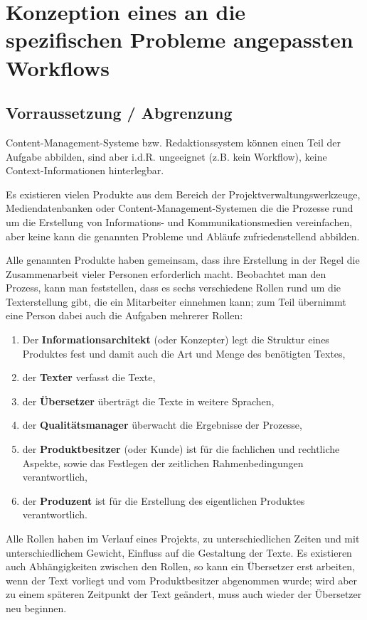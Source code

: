 \section{Konzeption eines an die spezifischen Probleme angepassten Workflows}

\subsection{Vorraussetzung / Abgrenzung}

Content-Management-Systeme bzw. Redaktionssystem können einen Teil der Aufgabe abbilden, sind aber i.d.R. ungeeignet (z.B. kein Workflow), keine Context-Informationen hinterlegbar.



Es existieren vielen Produkte aus dem Bereich der Projektverwaltungswerkzeuge, Mediendatenbanken oder Content-Management-Systemen die die Prozesse rund um die Erstellung von Informations- und Kommunikationsmedien vereinfachen, aber keine kann die genannten Probleme und Abläufe zufriedenstellend abbilden.


Alle genannten Produkte haben gemeinsam, dass ihre Erstellung in der Regel die Zusammenarbeit vieler Personen erforderlich macht. Beobachtet man den Prozess, kann man feststellen, dass es sechs verschiedene Rollen rund um die Texterstellung gibt, die ein Mitarbeiter einnehmen kann; zum Teil übernimmt eine Person dabei auch die Aufgaben mehrerer Rollen:

\begin{enumerate}
\item{Der \textbf{Informationsarchitekt} (oder Konzepter) legt die Struktur eines Produktes fest und damit auch die Art und Menge des benötigten Textes,}
\item{der \textbf{Texter} verfasst die Texte,}
\item{der \textbf{Übersetzer} überträgt die Texte in weitere Sprachen,}
\item{der \textbf{Qualitätsmanager} überwacht die Ergebnisse der Prozesse,}
\item{der \textbf{Produktbesitzer} (oder Kunde) ist für die fachlichen und rechtliche Aspekte, sowie das Festlegen der zeitlichen Rahmenbedingungen verantwortlich,}
\item{der \textbf{Produzent} ist für die Erstellung des eigentlichen Produktes verantwortlich.}
\end{enumerate}

Alle Rollen haben im Verlauf eines Projekts, zu unterschiedlichen Zeiten und mit unterschiedlichem Gewicht, Einfluss auf die Gestaltung der Texte. Es existieren auch Abhängigkeiten zwischen den Rollen, so kann ein Übersetzer erst arbeiten, wenn der Text vorliegt und vom Produktbesitzer abgenommen wurde; wird aber zu einem späteren Zeitpunkt der Text geändert, muss auch wieder der Übersetzer neu beginnen.






